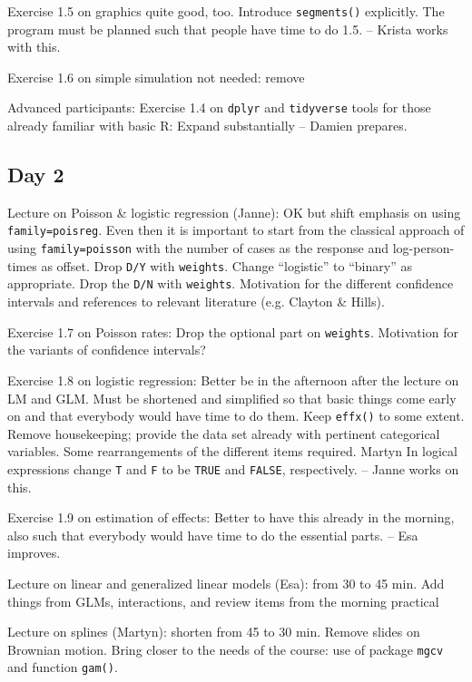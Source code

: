 Exercise 1.5 on graphics quite good, too. Introduce {\tt segments()} explicitly. 
 The program must be planned such that
people have time to do 1.5. -- Krista works with this.

Exercise 1.6 on simple simulation not needed: remove

Advanced participants: Exercise 1.4 on {\tt dplyr} and {\tt tidyverse} 
tools for those already familiar with basic R: Expand substantially -- Damien prepares.


\subsection*{Day 2}

Lecture on Poisson \& logistic regression (Janne): 
OK but shift emphasis on using {\tt family=poisreg}. 
Even then it is important to start from the
classical approach of using {\tt family=poisson} with the number of cases as the response and log-person-times as offset.
Drop {\tt D/Y} with {\tt weights}. Change ``logistic'' to ``binary'' as appropriate. Drop the {\tt D/N} with {\tt weights}. 
Motivation for the different confidence intervals and references to relevant literature (e.g. Clayton \& Hills).

Exercise 1.7 on Poisson rates: Drop the optional part on {\tt weights}. Motivation for the variants of confidence intervals? 

Exercise 1.8 on logistic regression: Better be in the afternoon after the lecture on LM and GLM.
Must be shortened and simplified so that basic things come early on and that everybody would have time to do them.
 Keep {\tt effx()} to some extent. Remove housekeeping;
provide the data set already with pertinent categorical variables. 
 Some rearrangements of the different items required. Martyn 
In logical expressions change {\tt T} and {\tt F} to be {\tt TRUE} and {\tt FALSE}, respectively. -- Janne works on this.

Exercise 1.9 on estimation of effects: Better to have this already in the morning, also such that everybody would have time
to do the essential parts. -- Esa improves. 

Lecture on linear and generalized linear models (Esa): from 30 to 45 min. Add things from GLMs, interactions, and review
items from the morning practical

Lecture on splines (Martyn): shorten from 45 to 30 min. Remove slides on Brownian motion. Bring closer
to the needs of the course: use of package {\tt mgcv} and function {\tt gam()}.  

